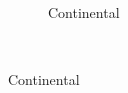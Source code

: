 \begin{figure}
\begin{subfigure}{0.22\textwidth}
        \caption{Continental}
    \end{subfigure}\\%

\end{figure}
